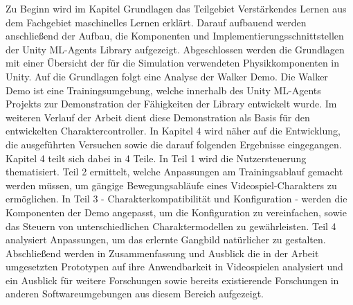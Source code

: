 Zu Beginn wird im Kapitel Grundlagen das Teilgebiet \grqq{}Verstärkendes Lernen\grqq{} aus dem Fachgebiet maschinelles Lernen erklärt. Darauf aufbauend werden anschließend der Aufbau, die Komponenten und Implementierungsschnittstellen der Unity ML-Agents Library aufgezeigt. Abgeschlossen werden die Grundlagen mit einer Übersicht der für die Simulation verwendeten Physikkomponenten in Unity. Auf die Grundlagen folgt eine Analyse der Walker Demo. Die Walker Demo ist eine Trainingsumgebung, welche innerhalb des Unity ML-Agents Projekts zur Demonstration der Fähigkeiten der Library entwickelt wurde. Im weiteren Verlauf der Arbeit dient diese Demonstration als Basis für den entwickelten Charaktercontroller. In Kapitel 4 wird näher auf die Entwicklung, die ausgeführten Versuchen sowie die darauf folgenden Ergebnisse eingegangen. Kapitel 4 teilt sich dabei in 4 Teile. In Teil 1 wird die Nutzersteuerung thematisiert. Teil 2 ermittelt, welche Anpassungen am Trainingsablauf gemacht werden müssen, um gängige Bewegungsabläufe eines Videospiel-Charakters zu ermöglichen. In Teil 3 - Charakterkompatibilität und Konfiguration - werden die Komponenten der Demo angepasst, um die Konfiguration zu vereinfachen, sowie das Steuern von unterschiedlichen Charaktermodellen zu gewährleisten. Teil 4 analysiert Anpassungen, um das erlernte Gangbild natürlicher zu gestalten. Abschließend werden in Zusammenfassung und Ausblick die in der Arbeit umgesetzten Prototypen auf ihre Anwendbarkeit in Videospielen analysiert und ein Ausblick für weitere Forschungen sowie bereits existierende Forschungen in anderen Softwareumgebungen aus diesem Bereich aufgezeigt.